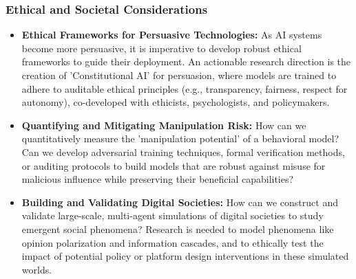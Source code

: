 \subsubsection*{Ethical and Societal Considerations}
\begin{itemize}
    \item \textbf{Ethical Frameworks for Persuasive Technologies:} As AI systems become more persuasive, it is imperative to develop robust ethical frameworks to guide their deployment. An actionable research direction is the creation of 'Constitutional AI' for persuasion, where models are trained to adhere to auditable ethical principles (e.g., transparency, fairness, respect for autonomy), co-developed with ethicists, psychologists, and policymakers.

    \item \textbf{Quantifying and Mitigating Manipulation Risk:} How can we quantitatively measure the 'manipulation potential' of a behavioral model? Can we develop adversarial training techniques, formal verification methods, or auditing protocols to build models that are robust against misuse for malicious influence while preserving their beneficial capabilities?

    \item \textbf{Building and Validating Digital Societies:} How can we construct and validate large-scale, multi-agent simulations of digital societies to study emergent social phenomena? Research is needed to model phenomena like opinion polarization and information cascades, and to ethically test the impact of potential policy or platform design interventions in these simulated worlds.
\end{itemize}

